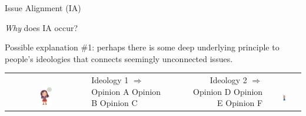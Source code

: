 \documentclass[12pt]{beamer}
\begin{document}
\begin{frame}[c]{Issue Alignment (IA)} %


\textit{Why} does IA occur?

Possible explanation \#1: perhaps there is some deep underlying
principle to people's ideologies that connects seemingly unconnected issues.
\pause

\begin{center}
\begin{tabular}{clp{1cm}rc}
\makecell{
\\
\includegraphics[width=0.15\textwidth]{thinker1.jpg}
} &
\makecell{
Ideology 1 $\Rightarrow$ \\
Opinion A \\
Opinion B \\
Opinion C \\} & &
\makecell{
Ideology 2 $\Rightarrow$ \\
Opinion D \\
Opinion E \\
Opinion F \\} &
\makecell{
\\
\includegraphics[width=0.1\textwidth]{thinker2.jpg}
}
\end{tabular}
\end{center}

\end{frame}
\end{document}
